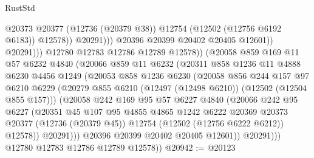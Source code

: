 \begin{lexlean}{RustStd}
\begin{coremodule}
                                    @20373
                                    @20377
                                    (@12736 (@20379 @38))
                                    @12754
                                    (@12502 (@12756 @6192 @6183))
                                    @12578))
                                @20291)))
                          @20396
                          @20399
                          @20402
                          @20405
                          @12601))
                      @20291)))
                @12780
                @12783
                @12786
                @12789
                @12578))
            (@20058
              @859
              @169
              @11
              @57
              @6232
              @4840
              (@20066
                @859
                @11
                @6232
                (@20311
                  @858
                  @1236
                  @11
                  @4888
                  @6230
                  @4456
                  @1249
                  (@20053
                    @858
                    @1236
                    @6230
                    (@20058
                      @856
                      @244
                      @157
                      @97
                      @6210
                      @6229
                      (@20279 @855 @6210 (@12497 (@12498 @6210)) (@12502 (@12504 @855 @157)))
                      (@20058
                        @242
                        @169
                        @95
                        @57
                        @6227
                        @4840
                        (@20066
                          @242
                          @95
                          @6227
                          (@20351
                            @45
                            @107
                            @95
                            @4855
                            @4865
                            @1242
                            @6222
                            @20369
                            @20373
                            @20377
                            (@12736 (@20379 @45))
                            @12754
                            (@12502 (@12756 @6222 @6212))
                            @12578))
                        @20291)))
                  @20396
                  @20399
                  @20402
                  @20405
                  @12601))
              @20291)))
        @12780
        @12783
        @12786
        @12789
        @12578))
@20942 := @20123

\end{coremodule}
\end{lexlean}
